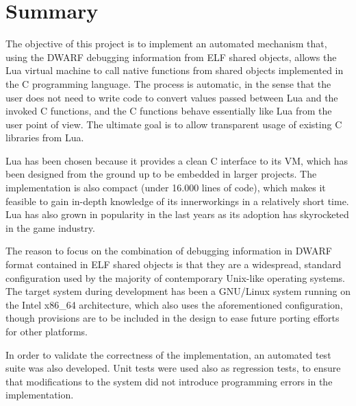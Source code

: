 \chapter*{Summary}

The objective of this project is to implement an automated mechanism that,
using the DWARF debugging information from ELF shared objects, allows the Lua
virtual machine to call native functions from shared objects implemented in
the C programming language. The process is automatic, in the sense that the
user does not need to write code to convert values passed between Lua and the
invoked C functions, and the C functions behave essentially like Lua from
the user point of view. The ultimate goal is to allow transparent usage of
existing C libraries from Lua.

Lua has been chosen because it provides a clean C interface to its \gls{VM},
which has been designed from the ground up to be embedded in larger projects.
The implementation is also compact (under 16.000 lines of code), which makes
it feasible to gain in-depth knowledge of its innerworkings in a relatively
short time. Lua has also grown in popularity in the last years as its adoption
has skyrocketed in the game industry.

The reason to focus on the combination of debugging information in DWARF
format contained in ELF shared objects is that they are a widespread, standard
configuration used by the majority of contemporary Unix-like operating
systems. The target system during development has been a GNU/Linux system
running on the Intel x86\_64 architecture, which also uses the aforementioned
configuration, though provisions are to be included in the design to ease
future porting efforts for other platforms.

In order to validate the correctness of the implementation, an automated test
suite was also developed. Unit tests were used also as regression tests, to
ensure that modifications to the system did not introduce programming errors
in the implementation.
